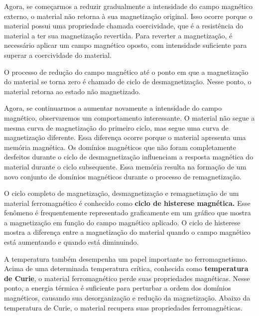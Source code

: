 Agora, se começarmos a reduzir gradualmente a intensidade do campo magnético externo, o material não retorna à sua magnetização original. Isso ocorre porque o material possui uma propriedade chamada coercividade, que é a resistência do material a ter sua magnetização revertida. Para reverter a magnetização, é necessário aplicar um campo magnético oposto, com intensidade suficiente para superar a coercividade do material.

O processo de redução do campo magnético até o ponto em que a magnetização do material se torna zero é chamado de ciclo de desmagnetização. Nesse ponto, o material retorna ao estado não magnetizado.

Agora, se continuarmos a aumentar novamente a intensidade do campo magnético, observaremos um comportamento interessante. O material não segue a mesma curva de magnetização do primeiro ciclo, mas segue uma curva de magnetização diferente. Essa diferença ocorre porque o material apresenta uma memória magnética. Os domínios magnéticos que não foram completamente desfeitos durante o ciclo de desmagnetização influenciam a resposta magnética do material durante o ciclo subsequente. Essa memória resulta na formação de um novo conjunto de domínios magnéticos durante o processo de remagnetização.

O ciclo completo de magnetização, desmagnetização e remagnetização de um material ferromagnético é conhecido como \textbf{ciclo de histerese magnética.} Esse fenômeno é frequentemente representado graficamente em um gráfico que mostra a magnetização em função do campo magnético aplicado. O ciclo de histerese mostra a diferença entre a magnetização do material quando o campo magnético está aumentando e quando está diminuindo.




A temperatura também desempenha um papel importante no ferromagnetismo. Acima de uma determinada temperatura crítica, conhecida como \textbf{temperatura de Curie}, o material ferromagnético perde suas propriedades magnéticas. Nesse ponto, a energia térmica é suficiente para perturbar a ordem dos domínios magnéticos, causando sua desorganização e redução da magnetização. Abaixo da temperatura de Curie, o material recupera suas propriedades ferromagnéticas.

